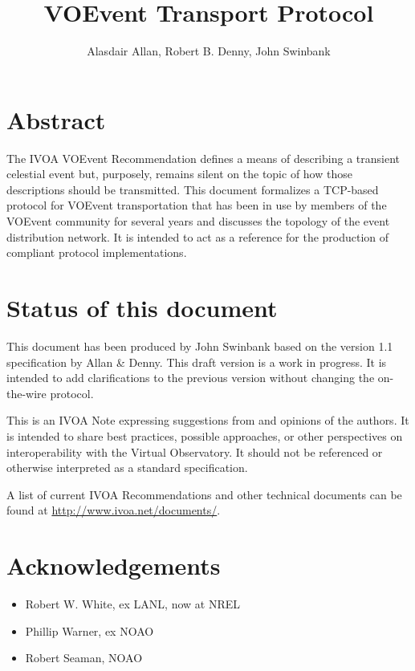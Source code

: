 \documentclass[a4paper,11pt]{ivoa}
\title{VOEvent Transport Protocol}
\author{Alasdair Allan, Robert B. Denny, John Swinbank}
\begin{document}
\maketitle

\section*{Abstract}

The IVOA VOEvent Recommendation \citep{Seaman:2011} defines a means of
describing a transient celestial event but, purposely, remains silent on the
topic of how those descriptions should be transmitted. This document
formalizes a TCP-based protocol for VOEvent transportation that has been in
use by members of the VOEvent community for several years and discusses the
topology of the event distribution network. It is intended to act as a
reference for the production of compliant protocol implementations.

\section*{Status of this document}

This document has been produced by John Swinbank based on the version 1.1
specification by Allan \& Denny. This draft version is a work in progress. It
is intended to add clarifications to the previous version without changing the
on-the-wire protocol.

This is an IVOA Note expressing suggestions from and opinions of the authors.
It is intended to share best practices, possible approaches, or other
perspectives on interoperability with the Virtual Observatory. It should not
be referenced or otherwise interpreted as a standard specification.

A list of current IVOA Recommendations and other technical documents can be
found at \url{http://www.ivoa.net/documents/}.

\section*{Acknowledgements}

\begin{itemize}
    \item{Robert W. White, ex LANL, now at NREL}
    \item{Phillip Warner, ex NOAO}
    \item{Robert Seaman, NOAO}
\end{itemize}
\end{document}

